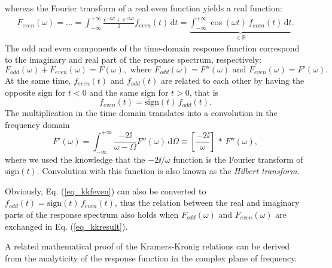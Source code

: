 whereas the Fourier transform of a real even function yields a real function:
\begin{equation} 
\begin{split} 
F_{even}(\omega)= \ldots =   \int_{-\infty}^{+\infty} \frac{e^{-\ii \omega t}+e^{+\ii \omega t}}{2} f_{even}(t) \,\mbox{d}t 
		 = \underbrace{\int_{-\infty}^{+\infty} \cos(\omega t) \, f_{even}(t) \,\mbox{d}t}_{\mbox{$\in \mathbb{R}$}}.
\end{split} 
\label{eq_kkFeven}\end{equation}
The odd and even components of the time-domain response function correspond to the imaginary and real part of the response spectrum, respectively:
\begin{equation} F_{odd}(\omega) + F_{even}(\omega) = F(\omega), \text{ where } F_{odd}(\omega) = F''(\omega) \text{ and } F_{even}(\omega) = F'(\omega).  \label{eq_kkFodd}\end{equation}
At the same time, $f_{even}(t)$ and $f_{odd}(t)$ are related to each other by having the opposite sign for $t<0$ and the same sign for $t>0$, that is 
\begin{equation} f_{even}(t) = \mbox{sign}(t)\,f_{odd}(t). \label{eq_kkfeven}\end{equation}
The multiplication in the time domain translates into a convolution in the frequency domain
\begin{equation} 
F'(\omega) = \int_{-\infty}^{+\infty}  \frac{-2\ii}{\omega - \Omega} F''(\omega) \,\mbox{d}\Omega  \equiv  \left[\frac{-2\ii}{\omega}\right]\,\ast\,F''(\omega),
\label{eq_kkresult}\end{equation} 
where we used the knowledge that the $-2\ii/\omega$ function is the Fourier transform of $\mbox{sign}(t)$. Convolution with this function is also known as the \textit{Hilbert transform}. %

Obviously, Eq. (\ref{eq_kkfeven}) can also be converted to $f_{odd}(t) = \mbox{sign}(t)\,f_{even}(t)$, thus the relation between the real and imaginary parts of the response spectrum also holds when $F_{odd}(\omega)$ and $F_{even}(\omega)$ are exchanged in Eq. (\ref{eq_kkresult}). 

A related mathematical proof of the Kramers-Kronig relations can be derived from the analyticity of the response function in the complex plane of frequency. \cite[p. 125]{klingshirn2007semiconductor}

